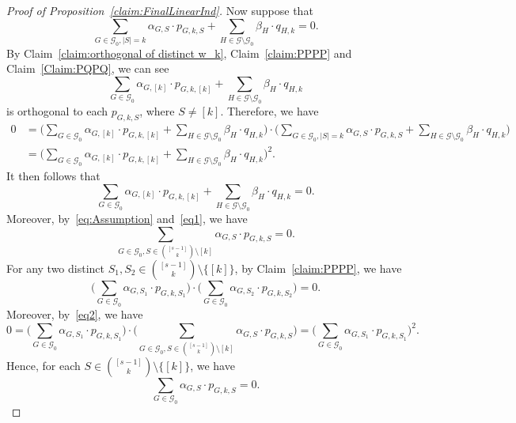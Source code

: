 \documentclass[10pt,a4paper]{amsart}
\begin{document}
\begin{proof}[Proof of Proposition~\ref{claim:FinalLinearInd}]
Now suppose that
\begin{equation}\label{eq:Assumption}
    \sum_{G\in \mathcal{G}_{0},|S|=k}\alpha_{G,S}\cdot p_{G,k,S}+\sum_{H\in \mathcal{G}\setminus\mathcal{G}_{0}}\beta_{H}\cdot q_{H,k}=0.
\end{equation}
By Claim~\ref{claim:orthogonal of distinct w_k}, Claim~\ref{claim:PPPP} and Claim~\ref{Claim:PQPQ}, we can see
\[\sum_{G\in \mathcal{G}_{0}}\alpha_{G,[k]}\cdot p_{G,k,[k]}+\sum_{H\in \mathcal{G}\setminus\mathcal{G}_{0}}\beta_{H}\cdot q_{H,k}\] is orthogonal to each $p_{G,k,S}$, where $S\neq [k]$. Therefore, we have
\[
\begin{aligned}
0&=\bigg(\sum_{G\in \mathcal{G}_{0}}\alpha_{G,[k]}\cdot p_{G,k,[k]}+\sum_{H\in \mathcal{G}\setminus\mathcal{G}_{0}}\beta_{H}\cdot q_{H,k}\bigg)\cdot\bigg(\sum_{G\in \mathcal{G}_{0},|S|=k}\alpha_{G,S}\cdot p_{G,k,S}+\sum_{H\in \mathcal{G}\setminus\mathcal{G}_{0}}\beta_{H}\cdot q_{H,k}\bigg)\\
&=\bigg(\sum_{G\in \mathcal{G}_{0}}\alpha_{G,[k]}\cdot p_{G,k,[k]}+\sum_{H\in \mathcal{G}\setminus\mathcal{G}_{0}}\beta_{H}\cdot q_{H,k}\bigg)^2.
\end{aligned}
\]
   It then follows that
     \begin{equation}\label{eq1}
         \sum_{G\in \mathcal{G}_{0}}\alpha_{G,[k]}\cdot p_{G,k,[k]}+\sum_{H\in \mathcal{G}\setminus\mathcal{G}_{0}}\beta_{H}\cdot q_{H,k}=0.
     \end{equation}
     Moreover, by~\eqref{eq:Assumption} and~\eqref{eq1}, we have
      \begin{equation}\label{eq2}
         \sum_{G\in \mathcal{G}_{0},S\in \binom{[s-1]}{k}\setminus {[k]}}\alpha_{G,S}\cdot p_{G,k,S}=0.
     \end{equation}
     For any two distinct $S_1,S_2\in \binom{[s-1]}{k}\setminus \{[k]\}$, by Claim~\ref{claim:PPPP}, we have 
     $$\bigg(\sum_{G\in \mathcal{G}_{0}}\alpha_{G,S_1}\cdot p_{G,k,S_1}\bigg)\cdot \bigg(\sum_{G\in \mathcal{G}_{0}}\alpha_{G,S_2}\cdot p_{G,k,S_2}\bigg)=0.$$
     Moreover, by~\eqref{eq2}, we have
     $$0=\bigg(\sum_{G\in \mathcal{G}_{0}}\alpha_{G,S_1}\cdot p_{G,k,S_1}\bigg)\cdot\bigg(\sum_{G\in \mathcal{G}_{0},S\in \binom{[s-1]}{k}\setminus {[k]}}\alpha_{G,S}\cdot p_{G,k,S}\bigg)=\bigg(\sum_{G\in \mathcal{G}_{0}}\alpha_{G,S_1}\cdot p_{G,k,S_1}\bigg)^2.$$
     Hence, for each $S\in \binom{[s-1]}{k}\setminus\{[k]\}$, we have
     \begin{equation}\label{eq3}
         \sum_{G\in \mathcal{G}_{0}}\alpha_{G,S}\cdot p_{G,k,S}=0.
     \end{equation}

\end{proof}
\end{document}
